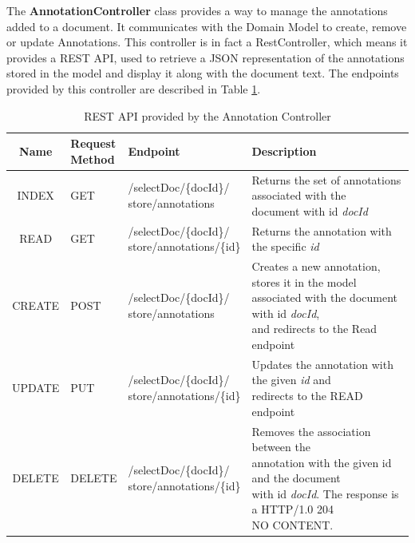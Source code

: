 \documentclass{llncs}
\begin{document}
The \textbf{AnnotationController} class provides a way to manage the annotations added to a document. It communicates with the Domain Model to create, remove or update Annotations. This controller is in fact a RestController, which means it provides a REST API, used to retrieve a JSON representation of the annotations stored in the model and display it along with the document text. 
The endpoints provided by this controller are described in Table \ref{table:endpoints}.
\begin{table}[ht]
\scriptsize
\centering
\begin{tabular}{ | c | m{1.5cm} | m{3.5cm} |m{7.7cm}|}
    \hline
    \textbf{Name} & \parbox[c][0.8cm]{1cm}{\textbf{Request}\\\textbf{Method }}& \textbf{Endpoint} & \textbf{Description}\\ \hline
	INDEX & GET & \parbox[c][0.8cm]{3.5cm}{/selectDoc/\{docId\}/\\store/annotations} & \parbox[c]{8cm}{Returns the set of annotations associated with the \\document with id \textit{docId} }\\ \hline
   	READ & GET & \parbox[c][0.8cm]{3.5cm}{/selectDoc/\{docId\}/\\store/annotations/\{id\}} & Returns the annotation with the specific \textit{id} \\ \hline
    CREATE & POST & \parbox[c]{3.5cm}{/selectDoc/\{docId\}/\\store/annotations} & \parbox[c][0.8cm]{8cm}{Creates a new annotation, stores it in the model \\associated with the document with id \textit{docId}, \\ and redirects to the Read endpoint} \\ \hline
    UPDATE & PUT & \parbox[c][0.8cm]{3.5cm}{/selectDoc/\{docId\}/\\store/annotations/\{id\}} & \parbox[c]{8cm}{Updates the annotation with the given \textit{id} and \\redirects to the READ endpoint} \\ \hline
    DELETE & DELETE & \parbox[t]{3.5cm}{/selectDoc/\{docId\}/\\store/annotations/\{id\}} & \parbox[c][1cm]{8cm}{Removes the association between the \\ annotation with the given id and the document \\ with id \textit{docId}. The response is a HTTP/1.0 204 \\ NO CONTENT.} \\ \hline
  \end{tabular}
  \caption{REST API provided by the Annotation Controller}
  \label{table:endpoints}
\end{table}
\end{document}
